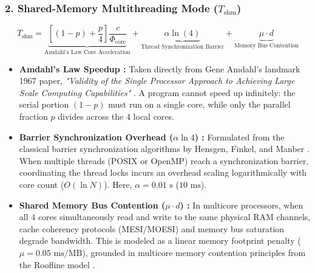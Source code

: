 \documentclass[11pt,a4paper]{article}
\begin{document}
\subsubsection*{2. Shared-Memory Multithreading Mode ($T_{\text{shm}}$)}
\begin{equation}
    T_{\text{shm}} = \underbrace{\left[(1-p) + \frac{p}{4}\right] \frac{c}{\Phi_{\text{core}}}}_{\text{Amdahl's Law Core Acceleration}} + \underbrace{\alpha \ln(4)}_{\text{Thread Synchronization Barrier}} + \underbrace{\mu \cdot d}_{\text{Memory Bus Contention}}
\end{equation}
\begin{itemize}[noitemsep, topsep=1pt]
    \item \textbf{Amdahl's Law Speedup \cite{amdahl1967validity}:} Taken directly from Gene Amdahl's landmark 1967 paper, \textit{"Validity of the Single Processor Approach to Achieving Large Scale Computing Capabilities"} \cite{amdahl1967validity}. A program cannot speed up infinitely: the serial portion $(1-p)$ must run on a single core, while only the parallel fraction $p$ divides across the 4 local cores.
    \item \textbf{Barrier Synchronization Overhead ($\alpha \ln 4$) \cite{hensgen1989barrier}:} Formulated from the classical barrier synchronization algorithms by Hensgen, Finkel, and Manber \cite{hensgen1989barrier}. When multiple threads (POSIX or OpenMP) reach a synchronization barrier, coordinating the thread locks incurs an overhead scaling logarithmically with core count ($O(\ln N)$). Here, $\alpha = 0.01\text{ s}$ ($10\text{ ms}$).
    \item \textbf{Shared Memory Bus Contention ($\mu \cdot d$) \cite{williams2009roofline}:} In multicore processors, when all 4 cores simultaneously read and write to the same physical RAM channels, cache coherency protocols (MESI/MOESI) and memory bus saturation degrade bandwidth. This is modeled as a linear memory footprint penalty ($\mu = 0.05\text{ ms/MB}$), grounded in multicore memory contention principles from the Roofline model \cite{williams2009roofline}.
\end{itemize}
\end{document}

